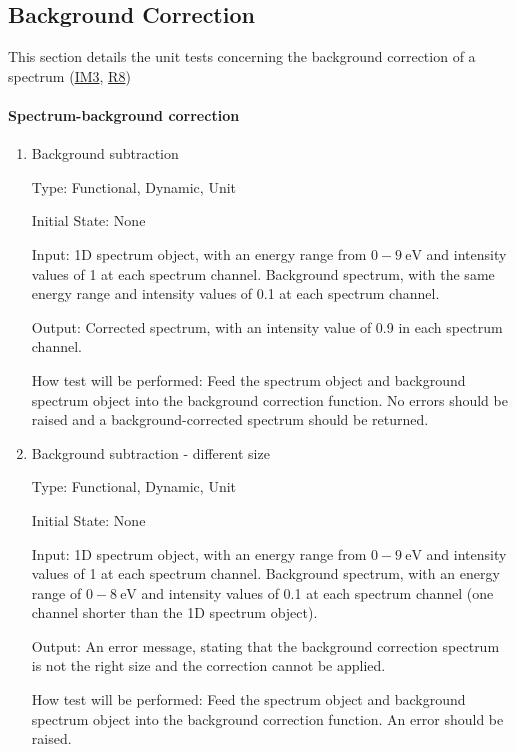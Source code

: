 \documentclass[12pt, titlepage]{article}
\begin{document}
\subsection{Background Correction}
This section details the unit tests concerning the background correction of a
spectrum (\hyperref[background]{IM3}, \hyperref[R_background]{R8})
\paragraph{Spectrum-background correction}

\begin{enumerate}

\item{Background subtraction}

Type: Functional, Dynamic, Unit

Initial State: None

Input: 1D spectrum object, with an energy range from $0-9\ \si{\electronvolt}$
and intensity values of 1 at each spectrum channel. Background spectrum, with
the same energy range and intensity values of 0.1 at each spectrum channel.

Output: Corrected spectrum, with an intensity value of 0.9 in each spectrum
channel.

How test will be performed: Feed the spectrum object and background spectrum
object into the background correction function. No errors should be raised and a
background-corrected spectrum should be returned.

\item{Background subtraction - different size}

Type: Functional, Dynamic, Unit

Initial State: None

Input: 1D spectrum object, with an energy range from $0-9\ \si{\electronvolt}$
and intensity values of 1 at each spectrum channel. Background spectrum, with an
energy range of $0-8\ \si{\electronvolt}$ and intensity values of 0.1 at each
spectrum channel (one channel shorter than the 1D spectrum object).

Output: An error message, stating that the background correction spectrum is not
the right size and the correction cannot be applied.

How test will be performed: Feed the spectrum object and background spectrum
object into the background correction function. An error should be raised.

\end{enumerate}
\end{document}

